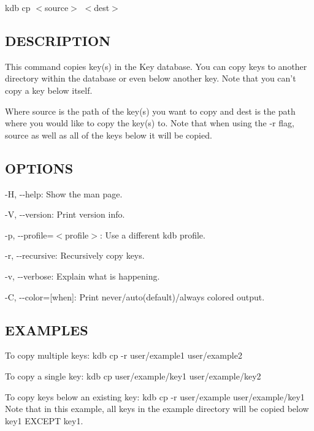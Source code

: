 {\ttfamily kdb cp $<$source$>$ $<$dest$>$}

\subsection*{D\+E\+S\+C\+R\+I\+P\+T\+I\+O\+N}

This command copies key(s) in the Key database. You can copy keys to another directory within the database or even below another key. Note that you can't copy a key below itself.

Where {\ttfamily source} is the path of the key(s) you want to copy and {\ttfamily dest} is the path where you would like to copy the key(s) to. Note that when using the {\ttfamily -\/r} flag, {\ttfamily source} as well as all of the keys below it will be copied.

\subsection*{O\+P\+T\+I\+O\+N\+S}


\begin{DoxyItemize}
\item {\ttfamily -\/\+H}, {\ttfamily -\/-\/help}\+: Show the man page.
\item {\ttfamily -\/\+V}, {\ttfamily -\/-\/version}\+: Print version info.
\item {\ttfamily -\/p}, {\ttfamily -\/-\/profile}=$<$profile$>$\+: Use a different kdb profile.
\item {\ttfamily -\/r}, {\ttfamily -\/-\/recursive}\+: Recursively copy keys.
\item {\ttfamily -\/v}, {\ttfamily -\/-\/verbose}\+: Explain what is happening.
\item {\ttfamily -\/\+C}, {\ttfamily -\/-\/color}=\mbox{[}when\mbox{]}\+: Print never/auto(default)/always colored output.
\end{DoxyItemize}

\subsection*{E\+X\+A\+M\+P\+L\+E\+S}

To copy multiple keys\+: {\ttfamily kdb cp -\/r user/example1 user/example2}

To copy a single key\+: {\ttfamily kdb cp user/example/key1 user/example/key2}

To copy keys below an existing key\+: {\ttfamily kdb cp -\/r user/example user/example/key1} Note that in this example, all keys in the example directory will be copied below {\ttfamily key1} E\+X\+C\+E\+P\+T {\ttfamily key1}. 